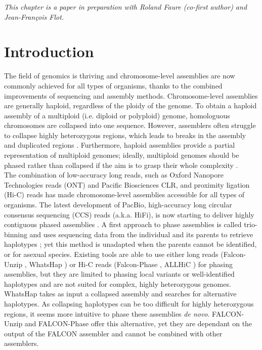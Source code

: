 %

\textit{This chapter is a paper in preparation with Roland Faure (co-first author) and Jean-François Flot.}

\section{Introduction}

The field of genomics is thriving and chromosome-level assemblies are now commonly achieved for all types of organisms, thanks to the combined improvements of sequencing and assembly methods. Chromosome-level assemblies are generally haploid, regardless of the ploidy of the genome. To obtain a haploid assembly of a multiploid (i.e. diploid or polyploid) genome, homologuous chromosomes are collapsed into one sequence. However, assemblers often struggle to collapse highly heterozygous regions, which leads to breaks in the assembly and duplicated regions \cite{guiglielmoni2020}. Furthermore, haploid assemblies provide a partial representation of multiploid genomes; ideally, multiploid genomes should be phased rather than collapsed if the aim is to grasp their whole complexity \cite{unzipping}.\\

The combination of low-accuracy long reads, such as Oxford Nanopore Technologies reads (ONT) and Pacific Biosciences CLR, and proximity ligation (Hi-C) reads has made chromosome-level assemblies accessible for all types of organisms. The latest development of PacBio, high-accuracy long circular consensus sequencing (CCS) reads (a.k.a. HiFi), is now starting to deliver highly contiguous phased assemblies \cite{flye,hifiasm,hicanu}. A first approach to phase assemblies is called trio-binning and uses sequencing data from the individual and its parents to retrieve haplotypes \cite{triocanu}; yet this method is unadapted when the parents cannot be identified, or for asexual species. Existing tools are able to use either long reads (Falcon-Unzip \cite{falcon-unzip}, WhatsHap \cite{whatshap}) or Hi-C reads (Falcon-Phase \cite{falcon-phase}, ALLHiC \cite{allhic}) for phasing assemblies, but they are limited to phasing local variants or well-identified haplotypes and are not suited for complex, highly heterozygous genomes. WhatsHap takes as input a collapsed assembly and searches for alternative haplotypes. As collapsing haplotypes can be too difficult for highly heterozygous regions, it seems more intuitive to phase these assemblies \textit{de novo}. FALCON-Unzip and FALCON-Phase offer this alternative, yet they are dependant on the output of the FALCON assembler and cannot be combined with other assemblers. \\

